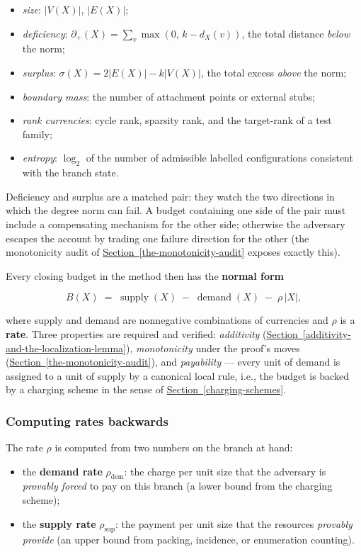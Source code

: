 \documentclass[
  11pt,
]{article}
\providecommand{\tightlist}{%
  \setlength{\itemsep}{0pt}\setlength{\parskip}{0pt}}
\theoremstyle{definition}
\newcommand{\secref}[1]{\hyperref[#1]{Section~\ref*{#1}}}
\begin{document}
\begin{itemize}
\tightlist
\item
  \emph{size}: \(|V(X)|\), \(|E(X)|\);
\item
  \emph{deficiency}: \(\partial_+(X)=\sum_{v}\max(0,\,k-d_X(v))\), the
  total distance \emph{below} the norm;
\item
  \emph{surplus}: \(\sigma(X)=2|E(X)|-k|V(X)|\), the total excess
  \emph{above} the norm;
\item
  \emph{boundary mass}: the number of attachment points or external
  stubs;
\item
  \emph{rank currencies}: cycle rank, sparsity rank, and the target-rank
  of a test family;
\item
  \emph{entropy}: \(\log_2\) of the number of admissible labelled
  configurations consistent with the branch state.
\end{itemize}

Deficiency and surplus are a matched pair: they watch the two directions
in which the degree norm can fail. A budget containing one side of the
pair must include a compensating mechanism for the other side; otherwise
the adversary escapes the account by trading one failure direction for
the other (the monotonicity audit of \secref{the-monotonicity-audit} exposes exactly this).

Every closing budget in the method then has the \textbf{normal form}

\[
B(X) \;=\; \operatorname{supply}(X)\;-\;\operatorname{demand}(X)\;-\;\rho\,|X|,
\]

where supply and demand are nonnegative combinations of currencies and
\(\rho\) is a \textbf{rate}. Three properties are required and verified:
\emph{additivity} (\secref{additivity-and-the-localization-lemma}), \emph{monotonicity} under the proof's
moves (\secref{the-monotonicity-audit}), and \emph{payability} --- every unit of demand is
assigned to a unit of supply by a canonical local rule, i.e., the budget
is backed by a charging scheme in the sense of \secref{charging-schemes}.



\subsubsection{Computing rates
backwards}\label{computing-rates-backwards}

The rate \(\rho\) is computed from two numbers on the branch at hand:

\begin{itemize}
\tightlist
\item
  the \textbf{demand rate} \(\rho_{\mathrm{dem}}\): the charge per unit
  size that the adversary is \emph{provably forced} to pay on this
  branch (a lower bound from the charging scheme);
\item
  the \textbf{supply rate} \(\rho_{\mathrm{sup}}\): the payment per unit
  size that the resources \emph{provably provide} (an upper bound from
  packing, incidence, or enumeration counting).
\end{itemize}
\end{document}
